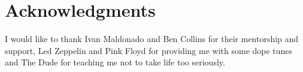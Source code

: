 \chapter*{Acknowledgments}
I would like to thank Ivan Maldonado and Ben Collins for their mentorship and support, Led Zeppelin and Pink Floyd for providing me with some dope tunes and The Dude for teaching me not to take life too seriously.  
